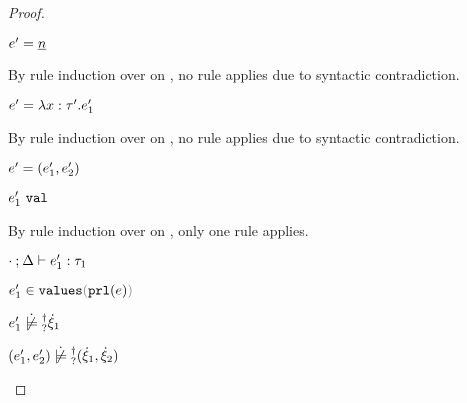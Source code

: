 \begin{proof}
\begin{byCases}
\begin{byCases}
\begin{byCases}
\begin{byCases}
\begin{byCases}
\begin{byCases}
\begin{pfsteps*}
              \item $e'=\underline{n}$ 
              \end{pfsteps*} 
              By rule induction over  on , no rule applies due to syntactic contradiction.
              \item[\text{(\ref{rule:VLam})}]
              \begin{pfsteps*} 
              \item $e'=\lambda x:\tau'.e_1'$ 
              \end{pfsteps*}
              By rule induction over  on , no rule applies due to syntactic contradiction.
              \item[\text{(\ref{rule:VPair})}] 
              \begin{pfsteps*} 
              \item $e'=(e_1' , e_2')$ 
              \item $e_1' ~\mathtt{val}$  
              \end{pfsteps*}
              By rule induction over  on , only one rule applies.
              \begin{byCases}
                \item[\text{(\ref{rule:TPair})}]
                \begin{pfsteps*}
                \item $\cdot \mathbin{;} \Delta \vdash e_1' : \tau_1$  
                \item $\inValues{e_1'}{\hprl{e}}$  
                \item $\cnotsatisfyormay{e_1'}{\hxi_1}$  
                \item $\cnotsatisfyormay{\hpair{e_1'}{e_2'}}{\cpair{\hxi_1}{\hxi_2}}$ 
                \end{pfsteps*} 
              \end{byCases}
              \item[\text{(\ref{rule:VInl})}] 
              \begin{pfsteps*} 

\end{pfsteps*}
\end{byCases}
\end{byCases}
\end{byCases}
\end{byCases}
\end{byCases}
\end{byCases}
\end{proof}
